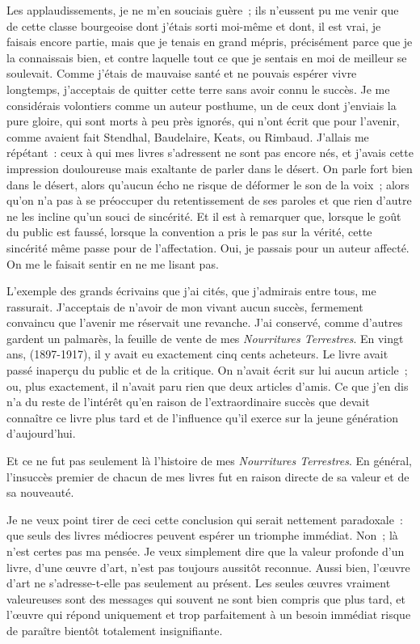 \documentclass[french,twoside]{book} %
\begin{document}
Les applaudissements, je ne m’en souciais guère ; ils n’eussent pu me venir que de cette classe bourgeoise dont j’étais sorti moi-même et dont, il est vrai, je faisais encore partie, mais que je tenais en grand mépris, précisément parce que je la connaissais bien, et contre laquelle tout ce que je sentais en moi de meilleur se soulevait. Comme j’étais de mauvaise santé et ne pouvais espérer vivre longtemps, j’acceptais de quitter cette terre sans avoir connu le succès. Je me considérais volontiers comme un auteur posthume, un de ceux dont j’enviais la pure gloire, qui sont morts à peu près ignorés, qui n’ont écrit que pour l’avenir, comme avaient fait Stendhal, Baudelaire, Keats, ou Rimbaud. J’allais me répétant : ceux à qui mes livres s’adressent ne sont pas encore nés, et j’avais cette impression douloureuse mais exaltante de parler dans le désert. On parle fort bien dans le désert, alors qu’aucun écho ne risque de déformer le son de la voix ; alors qu’on n’a pas à se préoccuper du retentissement de ses paroles et que rien d’autre ne les incline qu’un souci de sincérité. Et il est à remarquer que, lorsque le goût du public est faussé, lorsque la convention a pris le pas sur la vérité, cette sincérité même passe pour de l’affectation. Oui, je passais pour un auteur affecté. On me le faisait sentir en ne me lisant pas.\par
L’exemple des grands écrivains que j’ai cités, que j’admirais entre tous, me rassurait. J’acceptais de n’avoir de mon vivant aucun succès, fermement convaincu que l’avenir me réservait une revanche. J’ai conservé, comme d’autres gardent un palmarès, la feuille de vente de mes \emph{Nourritures Terrestres}. En vingt ans, (1897-1917), il y avait eu exactement cinq cents acheteurs. Le livre avait passé inaperçu du public et de la critique. On n’avait écrit sur lui aucun article ; ou, plus exactement, il n’avait paru rien que deux articles d’amis. Ce que j’en dis n’a du reste de l’intérêt qu’en raison de l’extraordinaire succès que devait connaître ce livre plus tard et de l’influence qu’il exerce sur la jeune génération d’aujourd’hui.\par
Et ce ne fut pas seulement là l’histoire de mes \emph{Nourritures Terrestres}. En général, l’insuccès premier de chacun de mes livres fut en raison directe de sa valeur et de sa nouveauté.\par
Je ne veux point tirer de ceci cette conclusion qui serait nettement paradoxale : que seuls des livres médiocres peuvent espérer un triomphe immédiat. Non ; là n’est certes pas ma pensée. Je veux simplement dire que la valeur profonde d’un livre, d’une œuvre d’art, n’est pas toujours aussitôt reconnue. Aussi bien, l’œuvre d’art ne s’adresse-t-elle pas seulement au présent. Les seules œuvres vraiment valeureuses sont des messages qui souvent ne sont bien compris que plus tard, et l’œuvre qui répond uniquement et trop parfaitement à un besoin immédiat risque de paraître bientôt totalement insignifiante.\par
\end{document}
